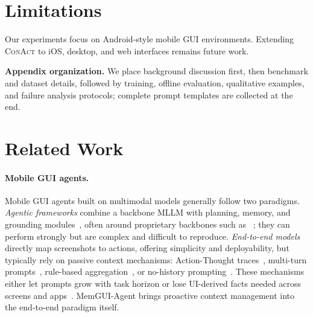 \documentclass{llmxive}
\providecommand{\llmname}[1]{{\fontfamily{pcr}\selectfont{#1}}}
\providecommand{\ourmethod}{MemGUI-Agent\xspace}
\providecommand{\conact}{\textsc{ConAct}\xspace}
\begin{document}
\section*{Limitations}

Our experiments focus on Android-style mobile GUI environments. Extending \conact to iOS, desktop, and web interfaces remains future work.






\appendix

\noindent\textbf{Appendix organization.}
We place background discussion first, then benchmark and dataset details, followed by training, offline evaluation, qualitative examples, and failure analysis protocols; complete prompt templates are collected at the end.

\section{Related Work}
\label{sec:related-work}
\vspace{-0.25em}

\paragraph{Mobile GUI agents.}
Mobile GUI agents built on multimodal models generally follow two paradigms. 
\emph{Agentic frameworks} combine a backbone MLLM with planning, memory, and grounding modules~\cite{rawles2025androidworld,wang2024mobile,wang2025mobileagentselfevolving,agashe2025agent}, often around proprietary backbones such as \llmname{Gemini-2.5-Pro}~\cite{comanici2025gemini}; they can perform strongly but are complex and difficult to reproduce. 
\emph{End-to-end models}~\cite{gao2026ui,zhou2025mai,hong2024cogagent,xu2026mobile} directly map screenshots to actions, offering simplicity and deployability, but typically rely on passive context mechanisms: Action-Thought traces~\cite{zhang2025appagent,gu2025ui-venus,xu2026mobile,bai2025qwen3}, multi-turn prompts~\cite{qin2025ui}, rule-based aggregation~\cite{zheng2024seeact}, or no-history prompting~\cite{hong2024cogagent}. 
These mechanisms either let prompts grow with task horizon or lose UI-derived facts needed across screens and apps~\cite{liu2026memgui,kong2025mobileworld}. 
\ourmethod brings proactive context management into the end-to-end paradigm itself.
\end{document}
